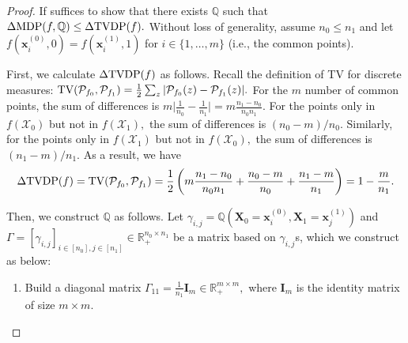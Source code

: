 \documentclass[10pt]{article} %
\begin{document}
        \begin{proof}
            If suffices to show that there exists $\mathbb{Q}$ such that $\Delta \textup{MDP}(f, \mathbb{Q}) \le \Delta \textup{TVDP}(f).$
            Without loss of generality, assume $n_{0} \le n_{1}$ and
            let $f(\mathbf{x}_{i}^{(0)}, 0) = f(\mathbf{x}_{i}^{(1)}, 1)$ for $i \in \{ 1, \ldots, m \}$ (i.e., the common points).

            First, we calculate $\Delta \textup{TVDP}(f)$ as follows.
            Recall the definition of TV for discrete measures: $\textup{TV}(\mathcal{P}_{f_{0}}, \mathcal{P}_{f_{1}}) = \frac{1}{2} \sum_{z} \vert \mathcal{P}_{f_{0}}(z) - \mathcal{P}_{f_{1}}(z) \vert.$
            For the $m$ number of common points, the sum of differences is $m \vert \frac{1}{n_{0}} - \frac{1}{n_{1}} \vert = m \frac{n_{1} - n_{0}}{n_{0} n_{1}}.$
            For the points only in $f(\mathcal{X}_{0})$ but not in $f(\mathcal{X}_{1}),$ the sum of differences is $(n_{0} - m) / n_{0}.$
            Similarly, for the points only in $f(\mathcal{X}_{1})$ but not in $f(\mathcal{X}_{0}),$ the sum of differences is $(n_{1} - m) / n_{1}.$
            As a result, we have
            \begin{equation}
                \begin{split}
                    \Delta \textup{TVDP}(f) 
                    = \textup{TV}(\mathcal{P}_{f_{0}}, \mathcal{P}_{f_{1}})
                    = \frac{1}{2} \left( m \frac{n_{1} - n_{0}}{n_{0} n_{1}} + \frac{n_{0} - m}{n_{0}} + \frac{n_{1} - m}{n_{1}} \right) = 1 - \frac{m}{n_{1}}.
                \end{split}
            \end{equation}

            Then, we construct $\mathbb{Q}$ as follows.
            Let $\gamma_{i, j} = \mathbb{Q}(\mathbf{X}_{0} = \mathbf{x}_{i}^{(0)}, \mathbf{X}_{1} = \mathbf{x}_{j}^{(1)})$
            and $\Gamma = [\gamma_{i, j}]_{i \in [n_{0}], j \in [n_{1}]} \in \mathbb{R}_{+}^{n_{0} \times n_{1}}$ be a matrix based on $\gamma_{i, j}$s, which we construct as below:
            \begin{enumerate}
                \item Build a diagonal matrix $\Gamma_{11} = \frac{1}{n_{1}} \mathbf{I}_{m} \in \mathbb{R}_{+}^{m \times m},$ where $\mathbf{I}_{m}$ is the identity matrix of size $m \times m.$
                

\end{enumerate}
\end{proof}
\end{document}
